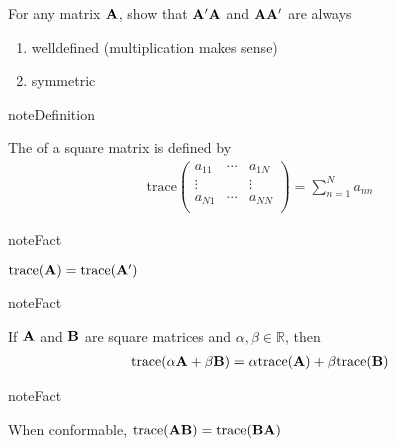 \documentclass[letterpaper,10pt,english]{jupyterBook}
\begin{document}
\sphinxAtStartPar
{} For any matrix \({\bf A}\), show that \({\bf A}' {\bf A}\) and \({\bf A} {\bf A}'\) are always
\begin{enumerate}
%
\item {} 
\sphinxAtStartPar
well\sphinxhyphen{}defined (multiplication makes sense)

\item {} 
\sphinxAtStartPar
symmetric

\end{enumerate}

\begin{sphinxadmonition}{note}{Definition}

\sphinxAtStartPar
The  of a square matrix is defined by
\begin{equation*}
\begin{split}
%
\mathrm{trace} \left(
\begin{array}{ccc}
a_{11} & \cdots & a_{1N} \\
\vdots & & \vdots \\
a_{N1} & \cdots & a_{NN} \\
\end{array}
\right)
= 
\sum_{n=1}^N a_{nn}
%
\end{split}
\end{equation*}\end{sphinxadmonition}

\begin{sphinxadmonition}{note}{Fact}

\sphinxAtStartPar
\(\mathrm{trace}({\bf A}) = \mathrm{trace}({\bf A}')\)
\end{sphinxadmonition}

\begin{sphinxadmonition}{note}{Fact}

\sphinxAtStartPar
If \({\bf A}\) and \({\bf B}\) are square matrices and
\(\alpha, \beta \in \mathbb{R}\), then
\begin{equation*}
\begin{split}
%
\mathrm{trace}(\alpha {\bf A} + \beta {\bf B}) 
= \alpha \mathrm{trace}({\bf A}) + \beta \mathrm{trace}({\bf B})
%
\end{split}
\end{equation*}\end{sphinxadmonition}

\begin{sphinxadmonition}{note}{Fact}

\sphinxAtStartPar
When conformable, \(\mathrm{trace}({\bf A} {\bf B}) = \mathrm{trace}({\bf B} {\bf A})\)
\end{sphinxadmonition}
\end{document}

